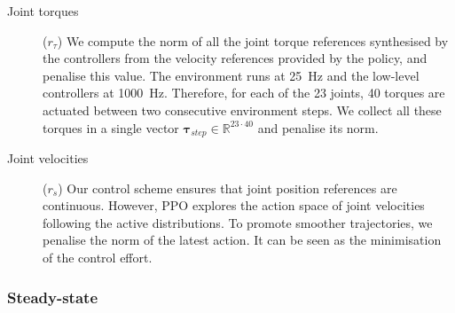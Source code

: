 \begin{description}

\item[Joint torques]\!($r_\tau$)\;
%
We compute the norm of all the joint torque references synthesised by the \pid controllers from the velocity references provided by the policy, and penalise this value.
The environment runs at 25~Hz and the low-level controllers at 1000~Hz.
Therefore, for each of the 23 joints, 40 torques are actuated between two consecutive environment steps.
We collect all these torques in a single vector $\boldsymbol{\tau}_{step} \in \mathbb{R}^{23\cdot40}$ and penalise its norm.

\item[Joint velocities]\!($r_{\dot{s}}$)\;
%
Our control scheme ensures that joint position references are continuous.
However, \ac{PPO} explores the action space of joint velocities following the active distributions.
To promote smoother trajectories, we penalise the norm of the latest action.
It can be seen as the minimisation of the control effort.

\end{description}

\subsubsection{Steady-state}

